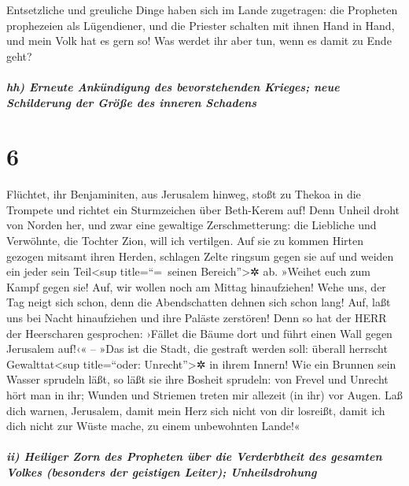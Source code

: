 Entsetzliche und greuliche Dinge haben sich im Lande
zugetragen: die Propheten prophezeien als Lügendiener,
und die Priester schalten mit ihnen Hand in Hand, und mein Volk hat es
gern so! Was werdet ihr aber tun, wenn es damit zu Ende geht?

\hypertarget{hh-erneute-ankuxfcndigung-des-bevorstehenden-krieges-neue-schilderung-der-gruxf6uxdfe-des-inneren-schadens}{%
\subparagraph{hh) Erneute Ankündigung des bevorstehenden Krieges; neue
Schilderung der Größe des inneren
Schadens}\label{hh-erneute-ankuxfcndigung-des-bevorstehenden-krieges-neue-schilderung-der-gruxf6uxdfe-des-inneren-schadens}}

\hypertarget{section-5}{%
\section{6}\label{section-5}}

Flüchtet, ihr Benjaminiten, aus Jerusalem hinweg, stoßt zu
Thekoa in die Trompete und richtet ein Sturmzeichen über Beth-Kerem auf!
Denn Unheil droht von Norden her, und zwar eine gewaltige
Zerschmetterung: die Liebliche und Verwöhnte, die Tochter
Zion, will ich vertilgen. Auf sie zu kommen Hirten gezogen
mitsamt ihren Herden, schlagen Zelte ringsum gegen sie auf und weiden
ein jeder sein Teil\textless sup title=``=~seinen Bereich''\textgreater✲
ab. »Weihet euch zum Kampf gegen sie! Auf, wir wollen noch
am Mittag hinaufziehen! Wehe uns, der Tag neigt sich schon, denn die
Abendschatten dehnen sich schon lang! Auf, laßt uns bei
Nacht hinaufziehen und ihre Paläste zerstören! Denn so hat
der HERR der Heerscharen gesprochen: ›Fället die Bäume dort und führt
einen Wall gegen Jerusalem auf!‹« -- »Das ist die Stadt, die gestraft
werden soll: überall herrscht Gewalttat\textless sup title=``oder:
Unrecht''\textgreater✲ in ihrem Innern! Wie ein Brunnen
sein Wasser sprudeln läßt, so läßt sie ihre Bosheit sprudeln: von Frevel
und Unrecht hört man in ihr; Wunden und Striemen treten mir allezeit (in
ihr) vor Augen. Laß dich warnen, Jerusalem, damit mein
Herz sich nicht von dir losreißt, damit ich dich nicht zur Wüste mache,
zu einem unbewohnten Lande!«

\hypertarget{ii-heiliger-zorn-des-propheten-uxfcber-die-verderbtheit-des-gesamten-volkes-besonders-der-geistigen-leiter-unheilsdrohung}{%
\subparagraph{ii) Heiliger Zorn des Propheten über die Verderbtheit des
gesamten Volkes (besonders der geistigen Leiter);
Unheilsdrohung}\label{ii-heiliger-zorn-des-propheten-uxfcber-die-verderbtheit-des-gesamten-volkes-besonders-der-geistigen-leiter-unheilsdrohung}}

